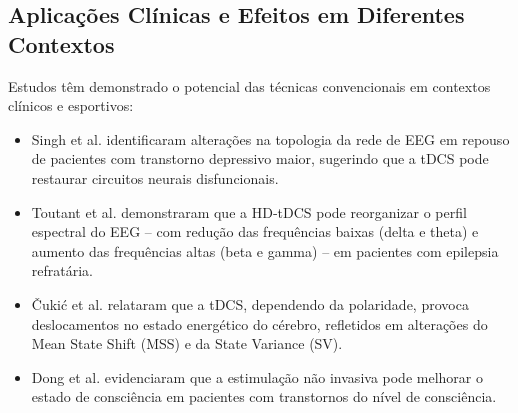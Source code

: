 \subsection{Aplicações Clínicas e Efeitos em Diferentes Contextos}
Estudos têm demonstrado o potencial das técnicas convencionais em contextos clínicos e esportivos:
\begin{itemize}
    \item Singh et al. \cite{singh2024evaluating} identificaram alterações na topologia da rede de EEG em repouso de pacientes com transtorno depressivo maior, sugerindo que a tDCS pode restaurar circuitos neurais disfuncionais.
    \item Toutant et al. \cite{toutant2024hdtdcs} demonstraram que a HD‑tDCS pode reorganizar o perfil espectral do EEG – com redução das frequências baixas (delta e theta) e aumento das frequências altas (beta e gamma) – em pacientes com epilepsia refratária.
    \item Čukić et al. \cite{cukic2018shift} relataram que a tDCS, dependendo da polaridade, provoca deslocamentos no estado energético do cérebro, refletidos em alterações do Mean State Shift (MSS) e da State Variance (SV).
    \item Dong et al. \cite{dong2023efficacy} evidenciaram que a estimulação não invasiva pode melhorar o estado de consciência em pacientes com transtornos do nível de consciência.
\end{itemize}

